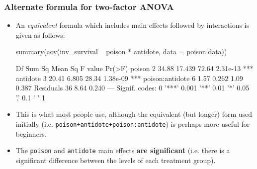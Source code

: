 \documentclass[a4paper]{article}
\begin{document}
\subsubsection{Alternate formula for two-factor ANOVA}
\begin{itemize}
	\item An \textit{equivalent} formula which includes main effects followed by interactions is given as follows:
\begin{Schunk}
\begin{Sinput}
summary(aov(inv_survival ~ poison * antidote, data = poison.data))
\end{Sinput}
\begin{Soutput}
                Df Sum Sq Mean Sq F value   Pr(>F)    
poison           2  34.88  17.439   72.64 2.31e-13 ***
antidote         3  20.41   6.805   28.34 1.38e-09 ***
poison:antidote  6   1.57   0.262    1.09    0.387    
Residuals       36   8.64   0.240                     
---
Signif. codes:  0 '***' 0.001 '**' 0.01 '*' 0.05 '.' 0.1 ' ' 1
\end{Soutput}
\end{Schunk}
	\item This is what most people use, although the equivalent (but longer) form used initially (i.e. \lstinline|poison+antidote+poison:antidote|) is perhaps more useful for beginners.
	\item The \lstinline|poison| and \lstinline|antidote| main effects \textbf{are significant} (i.e. there is a significant difference between the levels of each treatment group).
\end{itemize}
\end{document}
